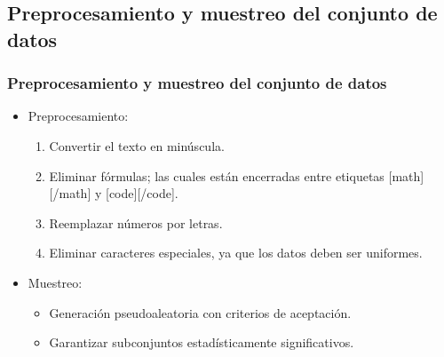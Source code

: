 \subsection{Preprocesamiento y muestreo del conjunto de datos}
\begin{frame}
	\frametitle{Preprocesamiento y muestreo del conjunto de datos}
	\begin{itemize}
		\item
		Preprocesamiento:
		\begin{enumerate}[<*>]
			\item Convertir el texto en minúscula.
			\item Eliminar fórmulas; las cuales están encerradas entre etiquetas [math][/math] y [code][/code].
			\item Reemplazar números por letras.
			\item Eliminar caracteres especiales, ya que los datos deben ser uniformes.
		\end{enumerate}

		\bigskip
		\item
		Muestreo:
		\begin{itemize}[<*>]
			\item Generación pseudoaleatoria con criterios de aceptación.
			\item Garantizar subconjuntos estadísticamente significativos.
		\end{itemize}
	\end{itemize}

\end{frame}

